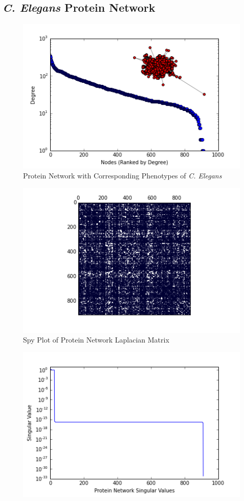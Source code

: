 \documentclass{article}
\begin{document}
\subsection{\textit{C. Elegans} Protein Network}
\begin{figure}[H]
\centering

\includegraphics[width=.8\linewidth]{gene_degree_histogram.png}
\caption{Protein Network with Corresponding Phenotypes of \textit{C. Elegans}}
  
\end{figure}

\begin{figure}[H]
\centering
\includegraphics[width = \linewidth]{genespy.png}
\caption{Spy Plot of Protein Network Laplacian Matrix}
\end{figure}
\begin{figure}[H]
\centering
\includegraphics[width = .9\linewidth]{proteinsing.png}
\end{figure}
\end{document}
